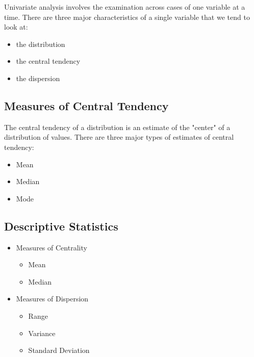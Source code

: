\documentclass[]{report}
\begin{document}
Univariate analysis involves the examination across cases of one variable at a time. There are three major characteristics of a single variable that we tend to look at:

\begin{itemize}
\item the distribution
\item the central tendency
\item the dispersion
\end{itemize}



\subsection{Measures of Central Tendency}
The central tendency of a distribution is an estimate of the "center" of a distribution of values. There are three major types of estimates of central tendency:

\begin{itemize}
\item Mean
\item Median
\item Mode
\end{itemize}

\subsection{Descriptive Statistics}



\begin{itemize}
\item Measures of Centrality
\begin{itemize}
\item Mean
\item Median
\end{itemize}
\item Measures of Dispersion
\begin{itemize}
\item Range
\item Variance
\item Standard Deviation
\end{itemize}
\end{itemize}
\end{document}

